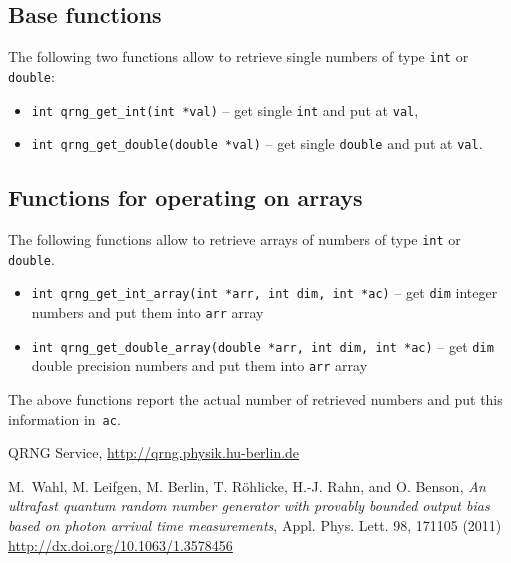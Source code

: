 \documentclass[a4paper,11pt]{article}
\begin{document}
\subsection{Base functions}
The following two functions allow to retrieve single numbers of type
\lstinline{int} or \lstinline{double}:
\begin{itemize}
    \item \lstinline{int qrng_get_int(int *val)} -- get single \lstinline{int}
    and put at \lstinline{val},
    \item \lstinline{int qrng_get_double(double *val)} -- get single
    \lstinline{double} and put at \lstinline{val}.
\end{itemize}

\subsection{Functions for operating on arrays}
The following functions allow to retrieve arrays of numbers of type
\lstinline{int} or \lstinline{double}.

\begin{itemize}
    \item \lstinline{int qrng_get_int_array(int *arr, int dim, int *ac)} -- get
    \lstinline{dim} integer numbers and put them into \lstinline{arr} array
    \item \lstinline{int qrng_get_double_array(double *arr, int dim, int *ac)}
    -- get \lstinline{dim} double precision numbers and put them into
    \lstinline{arr} array
\end{itemize}

The above functions report the actual number of retrieved numbers and put this
information in~\lstinline{ac}.

\begin{thebibliography}{2}
     QRNG Service, \url{http://qrng.physik.hu-berlin.de}

     M.~Wahl, M. Leifgen, M. Berlin, T. R\"ohlicke,
       H.-J. Rahn, and O. Benson, \emph{An ultrafast quantum random number
       generator with provably bounded output bias based on photon arrival time
       measurements}, Appl. Phys. Lett. 98, 171105 (2011)
       \url{http://dx.doi.org/10.1063/1.3578456}
\end{thebibliography}
\end{document}
